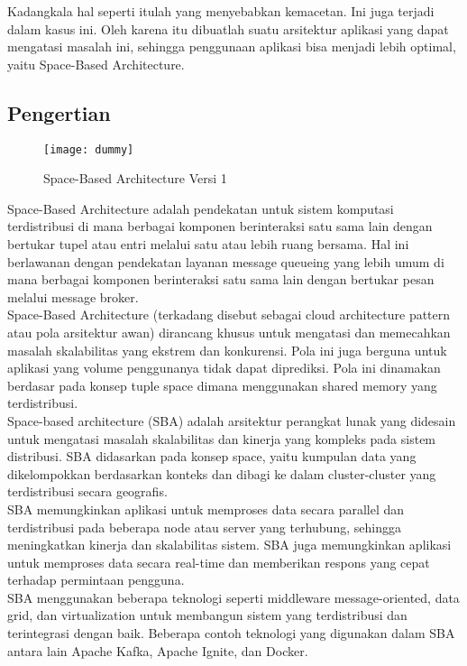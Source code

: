 Kadangkala hal seperti itulah yang menyebabkan kemacetan. Ini juga terjadi dalam kasus ini. Oleh karena itu dibuatlah suatu arsitektur aplikasi yang dapat mengatasi masalah ini, sehingga penggunaan aplikasi bisa menjadi lebih optimal, yaitu Space-Based Architecture.
\vskip0.5cm
\subsection{{Pengertian}}
\begin{figure}
	\centering
	\texttt{[image: dummy]}
	\caption{Space-Based Architecture Versi 1}
\end{figure}
 Space-Based Architecture adalah pendekatan untuk sistem komputasi terdistribusi di mana berbagai komponen berinteraksi satu sama lain dengan bertukar tupel atau entri melalui satu atau lebih ruang bersama. Hal ini berlawanan dengan pendekatan layanan message queueing yang lebih umum di mana berbagai komponen berinteraksi satu sama lain dengan bertukar pesan melalui message broker.\\

Space-Based Architecture (terkadang disebut sebagai cloud architecture pattern atau pola arsitektur awan) dirancang khusus untuk mengatasi dan memecahkan masalah skalabilitas yang ekstrem dan konkurensi. Pola ini juga berguna untuk aplikasi yang volume penggunanya tidak dapat diprediksi. Pola ini dinamakan berdasar pada konsep tuple space dimana menggunakan shared memory yang terdistribusi.\\

Space-based architecture (SBA) adalah arsitektur perangkat lunak yang didesain untuk mengatasi masalah skalabilitas dan kinerja yang kompleks pada sistem distribusi. SBA didasarkan pada konsep space, yaitu kumpulan data yang dikelompokkan berdasarkan konteks dan dibagi ke dalam cluster-cluster yang terdistribusi secara geografis.\\

SBA memungkinkan aplikasi untuk memproses data secara parallel dan terdistribusi pada beberapa node atau server yang terhubung, sehingga meningkatkan kinerja dan skalabilitas sistem. SBA juga memungkinkan aplikasi untuk memproses data secara real-time dan memberikan respons yang cepat terhadap permintaan pengguna.\\

SBA menggunakan beberapa teknologi seperti middleware message-oriented, data grid, dan virtualization untuk membangun sistem yang terdistribusi dan terintegrasi dengan baik. Beberapa contoh teknologi yang digunakan dalam SBA antara lain Apache Kafka, Apache Ignite, dan Docker.\\

